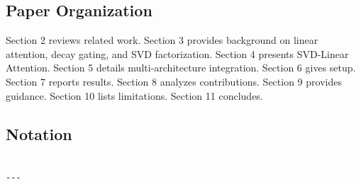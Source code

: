 \subsection{Paper Organization}

Section 2 reviews related work. Section 3 provides background on linear 
attention, decay gating, and SVD factorization. Section 4 presents 
SVD-Linear Attention. Section 5 details multi-architecture integration. 
Section 6 gives setup. Section 7 reports results. Section 8 analyzes 
contributions. Section 9 provides guidance. Section 10 lists limitations. 
Section 11 concludes.



\subsection{Notation}

\begin{lstlisting}

---
\end{lstlisting}